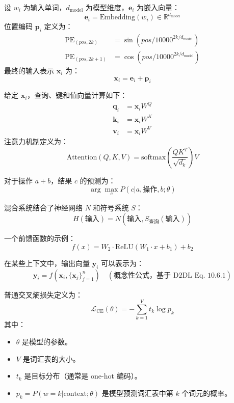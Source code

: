 \documentclass{article}
\begin{document}

设 $w_i$ 为输入单词，$d_{\text{model}}$ 为模型维度，$\mathbf{e}_i$ 为嵌入向量：
\[
\mathbf{e}_i = \text{Embedding}(w_i) \in \mathbb{R}^{d_{\text{model}}}
\]
位置编码 $\mathbf{p}_i$ 定义为：
\[
\begin{aligned}
\text{PE}_{(pos, 2k)} &= \sin(pos / 10000^{2k/d_{\text{model}}}) \\
\text{PE}_{(pos, 2k+1)} &= \cos(pos / 10000^{2k/d_{\text{model}}})
\end{aligned}
\]
最终的输入表示 $\mathbf{x}_i$ 为：
\[
\mathbf{x}_i = \mathbf{e}_i + \mathbf{p}_i
\]

给定 $\mathbf{x}_i$，查询、键和值向量计算如下：
\[
\begin{aligned}
\mathbf{q}_i &= \mathbf{x}_i W^Q \\
\mathbf{k}_i &= \mathbf{x}_i W^K \\
\mathbf{v}_i &= \mathbf{x}_i W^V
\end{aligned}
\]
注意力机制定义为：
\[
\text{Attention}(Q, K, V) = \text{softmax}\left(\frac{QK^T}{\sqrt{d_k}}\right)V
\]

对于操作 $a + b$，结果 $c$ 的预测为：
\[
\arg\max_c P(c | a, \text{操作}, b; \theta)
\]

混合系统结合了神经网络 $N$ 和符号系统 $S$：
\[
H(\text{输入}) = N(\text{输入}, S_{\text{查询}}(\text{输入}))
\]

一个前馈函数的示例：
\[
f(x) = W_2 \cdot \text{ReLU}(W_1 \cdot x + b_1) + b_2
\]

在某些上下文中，输出向量 $\mathbf{y}_i$ 可以表示为：
\[
\mathbf{y}_i = f\left(\mathbf{x}_i, \{\mathbf{x}_j\}_{j=1}^n\right) \quad (\text{概念性公式，基于 D2DL Eq. 10.6.1})
\]


普通交叉熵损失定义为：
\[
\mathcal{L}_{\text{CE}}(\theta) = - \sum_{k=1}^{V} t_k \log p_k
\]
其中：
\begin{itemize}
    \item \( \theta \) 是模型的参数。
    \item \( V \) 是词汇表的大小。
    \item \( t_k \) 是目标分布（通常是 one-hot 编码）。
    \item \( p_k = P(w=k | \text{context}; \theta) \) 是模型预测词汇表中第 \( k \) 个词元的概率。
\end{itemize}
\end{document}

